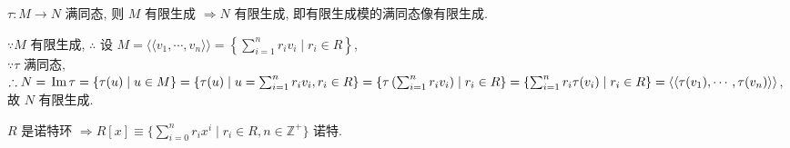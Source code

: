 \documentclass{note}
\begin{document}
\begin{cor}\label{cor for thm-5.8}
    $\tau:M\rightarrow N$ 满同态, 则 $M$ 有限生成 $\Longrightarrow N$ 有限生成, 即有限生成模的满同态像有限生成.
\end{cor}
\begin{pf}
    $\because M$ 有限生成, $\therefore$ 设 $M=\langle\langle v_1,\cdots,v_n\rangle\rangle=\left\{\sum_{i=1}^nr_iv_i\mid r_i\in R\right\}$,\\
    $\because\tau$ 满同态, $\therefore N=\,\mathrm{Im}\,\tau=\{\tau(u)\mid u\in M\}=\{\tau(u)\mid u=\sum_{i=1}^nr_iv_i,r_i\in R\}=\left\{\tau\left(\sum_{i=1}^nr_iv_i\right)\mid r_i\in R\right\}=\{\sum_{i=1}^nr_i\tau(v_i)\mid r_i\in R\}=\langle\langle\tau(v_1),\cdots,\tau(v_n)\rangle\rangle$, 故 $N$ 有限生成.
\end{pf}

\begin{thm}
    $R$ 是诺特环 $\Longrightarrow R[x]\equiv\{\sum_{i=0}^nr_ix^i\mid r_i\in R,n\in\mathbb{Z}^+\}$ 诺特.
\end{thm}
\ifx\allfiles\undefined
\end{document}
